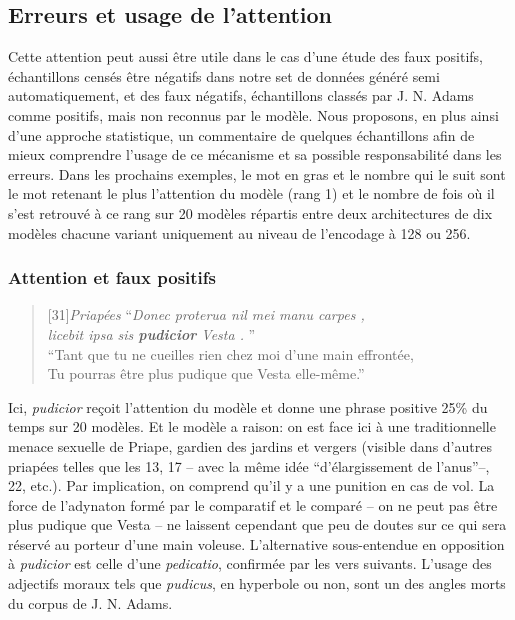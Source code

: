 \subsection{Erreurs et usage de l'attention}

Cette attention peut aussi être utile dans le cas d'une étude des faux positifs, échantillons censés être négatifs dans notre set de données généré semi automatiquement, et des faux négatifs, échantillons classés par J. N. Adams comme positifs, mais non reconnus par le modèle. Nous proposons, en plus ainsi d'une approche statistique, un commentaire de quelques échantillons afin de mieux comprendre l'usage de ce mécanisme et sa possible responsabilité dans les erreurs. Dans les prochains exemples, le mot en gras et le nombre qui le suit sont le mot retenant le plus l'attention du modèle (rang 1) et le nombre de fois où il s'est retrouvé à ce rang sur 20 modèles répartis entre deux architectures de dix modèles chacune variant uniquement au niveau de l'encodage à 128 ou 256.

\subsubsection{Attention et faux positifs}

\begin{quote}[31]{\textit{Priapées}}
    \enquote{\textit{Donec proterua nil mei manu carpes ,{\\}  licebit ipsa sis \textbf{pudicior} Vesta . }} \\
    \enquote{Tant que tu ne cueilles rien chez moi d’une main effrontée, {\\} Tu pourras être plus pudique que Vesta elle-même.}
\end{quote}

Ici, \textit{pudicior} reçoit l'attention du modèle et donne une phrase positive 25\% du temps sur 20 modèles. Et le modèle a raison: on est face ici à une traditionnelle menace sexuelle de Priape, gardien des jardins et vergers (visible dans d'autres priapées telles que les 13, 17 -- avec la même idée \enquote{d'élargissement de l'anus}--, 22, etc.). Par implication, on comprend qu'il y a une punition en cas de vol. La force de l'adynaton formé par le comparatif et le comparé -- on ne peut pas être plus pudique que Vesta -- ne laissent cependant que peu de doutes sur ce qui sera réservé au porteur d'une main voleuse. L'alternative sous-entendue en opposition à \textit{pudicior} est celle d'une \textit{pedicatio}, confirmée par les vers suivants. L'usage des adjectifs moraux tels que \textit{pudicus}, en hyperbole ou non, sont un des angles morts du corpus de J. N. Adams.

